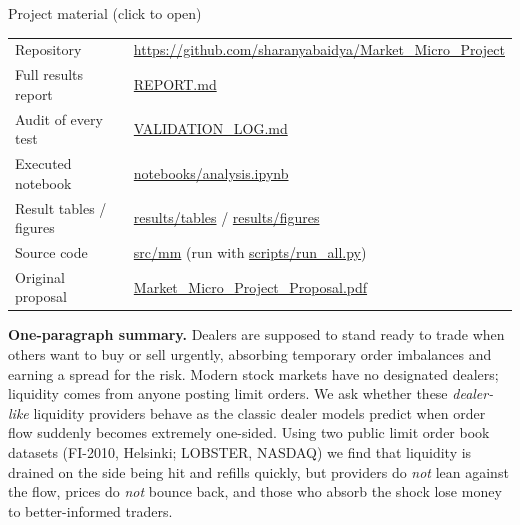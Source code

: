 \documentclass[11pt,a4paper]{article}
\begin{document}
\begin{keybox}{Project material (click to open)}
\begin{tabular}{@{}l p{11.8cm}@{}}
Repository & \url{https://github.com/sharanyabaidya/Market_Micro_Project}\\
Full results report & \href{https://github.com/sharanyabaidya/Market_Micro_Project/blob/main/REPORT.md}{REPORT.md}\\
Audit of every test & \href{https://github.com/sharanyabaidya/Market_Micro_Project/blob/main/VALIDATION_LOG.md}{VALIDATION\_LOG.md}\\
Executed notebook & \href{https://github.com/sharanyabaidya/Market_Micro_Project/blob/main/notebooks/analysis.ipynb}{notebooks/analysis.ipynb}\\
Result tables / figures & \href{https://github.com/sharanyabaidya/Market_Micro_Project/tree/main/results/tables}{results/tables} \;/\; \href{https://github.com/sharanyabaidya/Market_Micro_Project/tree/main/results/figures}{results/figures}\\
Source code & \href{https://github.com/sharanyabaidya/Market_Micro_Project/tree/main/src/mm}{src/mm} \;(run with \href{https://github.com/sharanyabaidya/Market_Micro_Project/blob/main/scripts/run_all.py}{scripts/run\_all.py})\\
Original proposal & \href{https://github.com/sharanyabaidya/Market_Micro_Project/blob/main/Market_Micro_Project_Proposal.pdf}{Market\_Micro\_Project\_Proposal.pdf}\\
\end{tabular}
\end{keybox}

\vspace{0.4cm}
\noindent\textbf{One-paragraph summary.}
Dealers are supposed to stand ready to trade when others want to buy or sell urgently, absorbing temporary
order imbalances and earning a spread for the risk. Modern stock markets have no designated dealers; liquidity
comes from anyone posting limit orders. We ask whether these \emph{dealer-like} liquidity providers behave as
the classic dealer models predict when order flow suddenly becomes extremely one-sided. Using two public
limit order book datasets (FI-2010, Helsinki; LOBSTER, NASDAQ) we find that liquidity is drained on the side
being hit and refills quickly, but providers do \emph{not} lean against the flow, prices do \emph{not} bounce
back, and those who absorb the shock lose money to better-informed traders.

\newpage
\end{document}
